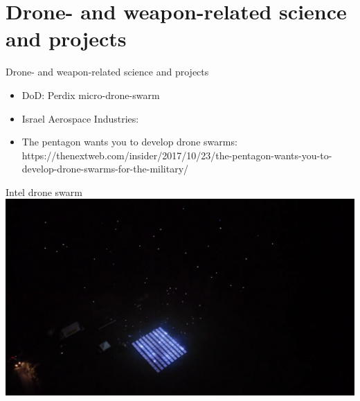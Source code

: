 \documentclass[aspectratio=169]{beamer}
\begin{document}
\section{Drone- and weapon-related science and projects}
\begin{frame}{Drone- and weapon-related science and projects}
	\begin{itemize}
		\item DoD: Perdix micro-drone-swarm
		\item Israel Aerospace Industries: 
        \item The pentagon wants you to develop drone swarms: https://thenextweb.com/insider/2017/10/23/the-pentagon-wants-you-to-develop-drone-swarms-for-the-military/
	\end{itemize}
\end{frame}

\begin{frame}{Intel drone swarm}
        	\centering
            \href{run:./videos/Intel.mp4?autostart}
            {\includegraphics[width=.95\linewidth]{images/intel.png}}
           
\end{frame}
\end{document}
